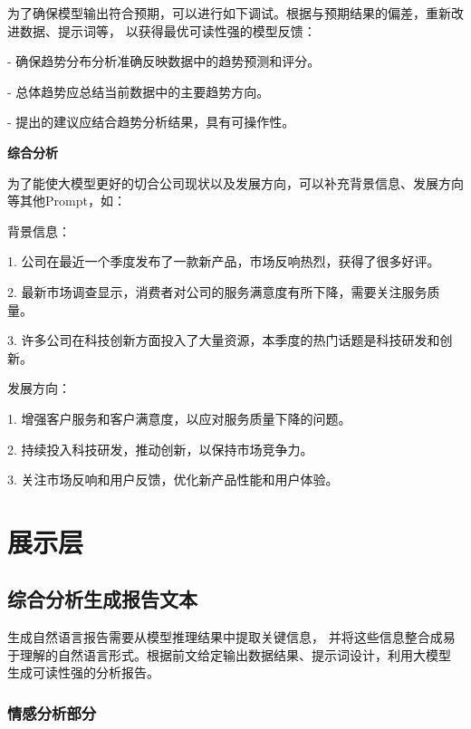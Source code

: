 \documentclass[UTF8,a4paper,15pt,titlepage,oneside]{ctexbook}
\begin{document}
为了确保模型输出符合预期，可以进行如下调试。根据与预期结果的偏差，重新改进数据、提示词等，
以获得最优可读性强的模型反馈：

- 确保趋势分布分析准确反映数据中的趋势预测和评分。

- 总体趋势应总结当前数据中的主要趋势方向。

- 提出的建议应结合趋势分析结果，具有可操作性。

\vskip 0.2cm
\noindent
\textbf{综合分析}

为了能使大模型更好的切合公司现状以及发展方向，可以补充背景信息、发展方向等其他Prompt，如：

\begin{mdframed}[backgroundcolor=lightgray!20, linecolor=darkgray, linewidth=1pt]
背景信息：

1. 公司在最近一个季度发布了一款新产品，市场反响热烈，获得了很多好评。

2. 最新市场调查显示，消费者对公司的服务满意度有所下降，需要关注服务质量。

3. 许多公司在科技创新方面投入了大量资源，本季度的热门话题是科技研发和创新。

\end{mdframed}

\begin{mdframed}[backgroundcolor=lightgray!20, linecolor=darkgray, linewidth=1pt]
发展方向：

1. 增强客户服务和客户满意度，以应对服务质量下降的问题。

2. 持续投入科技研发，推动创新，以保持市场竞争力。

3. 关注市场反响和用户反馈，优化新产品性能和用户体验。


\end{mdframed}


\section{展示层}

\subsection{综合分析生成报告文本}

生成自然语言报告需要从模型推理结果中提取关键信息，
并将这些信息整合成易于理解的自然语言形式。根据前文给定输出数据结果、提示词设计，利用大模型
生成可读性强的分析报告。

\subsubsection{情感分析部分}
\end{document}

